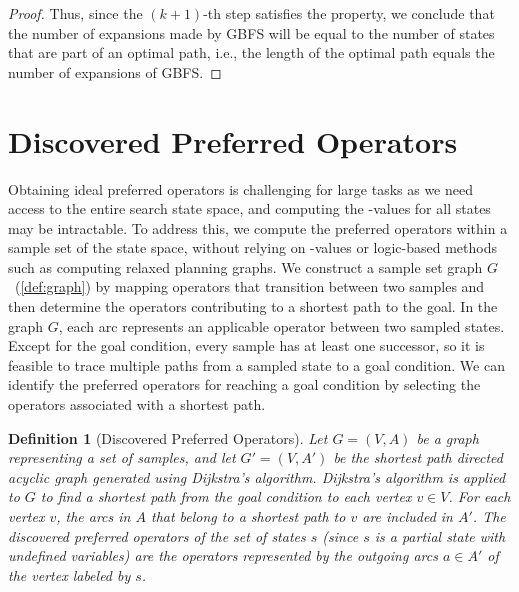 \documentclass[ppgc,diss,english]{iiufrgs}
\newtheorem{definition}{Definition}
\begin{document}
\begin{proof}
Thus, since the $(k+1)$-th step satisfies the property, we conclude that the number of expansions made by GBFS will be equal to the number of states that are part of an optimal path, i.e., the length of the optimal path equals the number of expansions of GBFS.
\end{proof}


\section{Discovered Preferred Operators}
\label{sec:sample-discovered-po}
Obtaining ideal preferred operators is challenging for large tasks as we need access to the entire search state space, and computing the \hstar-values for all states may be intractable. To address this, we compute the preferred operators within a sample set of the state space, without relying on \hstar-values or logic-based methods such as computing relaxed planning graphs. We construct a sample set graph $G$~(\vref{def:graph}) by mapping operators that transition between two samples and then determine the operators contributing to a shortest path to the goal.
In the graph $G$, each arc represents an applicable operator between two sampled states. Except for the goal condition, every sample has at least one successor, so it is feasible to trace multiple paths from a sampled state to a goal condition. We can identify the preferred operators for reaching a goal condition by selecting the operators associated with a shortest path.

\begin{definition}[Discovered Preferred Operators]\label{def:discovered_preferred_operators}
Let $G = (V, A)$ be a graph representing a set of samples, and let $G' = (V, A')$ be the shortest path directed acyclic graph generated using Dijkstra's algorithm. Dijkstra's algorithm is applied to $G$ to find a shortest path from the goal condition to each vertex $v \in V$. For each vertex $v$, the arcs in $A$ that belong to a shortest path to $v$ are included in $A'$. The discovered preferred operators of the set of states $s$ (since $s$ is a partial state with undefined variables) are the operators represented by the outgoing arcs $a \in A'$ of the vertex labeled by $s$.
\end{definition}
\end{document}
